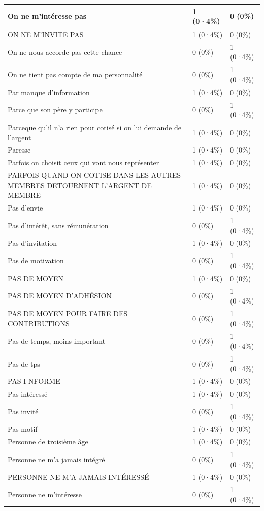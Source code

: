 \documentclass[
]{book}
\begin{document}
\begin{tabular}{l|l|l}
\hline
On ne m'intéresse pas & 1 (0·4\%) & 0 (0\%)\\
\hline
ON NE M'INVITE PAS & 1 (0·4\%) & 0 (0\%)\\
\hline
On ne nous accorde pas cette chance & 0 (0\%) & 1 (0·4\%)\\
\hline
On ne tient pas compte de ma personnalité & 0 (0\%) & 1 (0·4\%)\\
\hline
Par manque d'information & 1 (0·4\%) & 0 (0\%)\\
\hline
Parce que son père y participe & 0 (0\%) & 1 (0·4\%)\\
\hline
Parceque qu'il n'a rien pour cotisé si on lui demande de l'argent & 1 (0·4\%) & 0 (0\%)\\
\hline
Paresse & 1 (0·4\%) & 0 (0\%)\\
\hline
Parfois on choisit ceux qui vont nous représenter & 1 (0·4\%) & 0 (0\%)\\
\hline
PARFOIS QUAND ON COTISE DANS  LES AUTRES MEMBRES DETOURNENT L'ARGENT DE MEMBRE & 1 (0·4\%) & 0 (0\%)\\
\hline
Pas d'envie & 1 (0·4\%) & 0 (0\%)\\
\hline
Pas d'intérêt, sans rémunération & 0 (0\%) & 1 (0·4\%)\\
\hline
Pas d'invitation & 1 (0·4\%) & 0 (0\%)\\
\hline
Pas de motivation & 0 (0\%) & 1 (0·4\%)\\
\hline
PAS DE MOYEN & 1 (0·4\%) & 0 (0\%)\\
\hline
PAS DE MOYEN D'ADHÉSION & 0 (0\%) & 1 (0·4\%)\\
\hline
PAS DE MOYEN POUR FAIRE DES CONTRIBUTIONS & 0 (0\%) & 1 (0·4\%)\\
\hline
Pas de temps, moins important & 0 (0\%) & 1 (0·4\%)\\
\hline
Pas de tps & 0 (0\%) & 1 (0·4\%)\\
\hline
PAS I NFORME & 1 (0·4\%) & 0 (0\%)\\
\hline
Pas intéressé & 1 (0·4\%) & 0 (0\%)\\
\hline
Pas invité & 0 (0\%) & 1 (0·4\%)\\
\hline
Pas motif & 1 (0·4\%) & 0 (0\%)\\
\hline
Personne de troisième âge & 1 (0·4\%) & 0 (0\%)\\
\hline
Personne ne m'a jamais intégré & 0 (0\%) & 1 (0·4\%)\\
\hline
PERSONNE NE M'A JAMAIS INTÉRESSÉ & 1 (0·4\%) & 0 (0\%)\\
\hline
Personne ne m'intéresse & 0 (0\%) & 1 (0·4\%)\\

\end{tabular}
\end{document}
